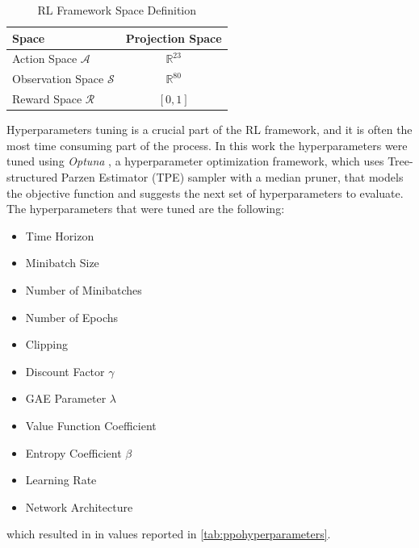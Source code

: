 \begin{table}
    \centering
    \begin{tabular}{l c}
        \toprule
        Space                           & Projection Space   \\
        \midrule
        Action Space $\mathcal{A}$      & $\mathbb{R} ^{23}$ \\
        Observation Space $\mathcal{S}$ & $\mathbb{R} ^{80}$ \\
        Reward Space $\mathcal{R}$      & $[0,1]$            \\
        \bottomrule
    \end{tabular}
    \caption{RL Framework Space Definition}
    \label{tab:rlspacedef}
\end{table}

Hyperparameters tuning is a crucial part of the \ac{RL} framework, and it is often the most time consuming part of the process. In this work the hyperparameters were tuned using \textit{Optuna} \cite{akiba_optuna_2019}, a hyperparameter optimization framework, which uses Tree-structured Parzen Estimator (\ac{TPE}) sampler with a median pruner, that models the objective function and suggests the next set of hyperparameters to evaluate. The hyperparameters that were tuned are the following:

\begin{itemize}
    \item Time Horizon
    \item Minibatch Size
    \item Number of Minibatches
    \item Number of Epochs
    \item Clipping
    \item Discount Factor $\gamma$
    \item GAE Parameter $\lambda$
    \item Value Function Coefficient
    \item Entropy Coefficient $\beta$
    \item Learning Rate
    \item Network Architecture
\end{itemize}

which resulted in in values reported in \cref{tab:ppohyperparameters}.


